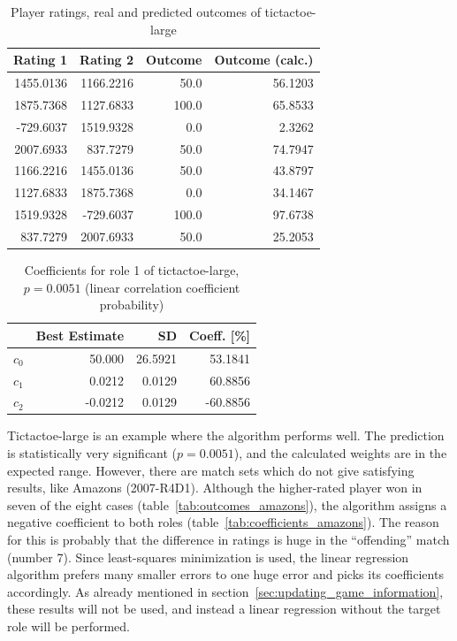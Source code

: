 \documentclass[a4paper,10pt]{article}
\begin{document}
\begin{table}[htp]
	\begin{center}
		\begin{tabular}{rrrr}
			\hline
			\textbf{Rating 1} & \textbf{Rating 2} & \textbf{Outcome} & \textbf{Outcome (calc.)} \\ 
			\hline
			1455.0136    &	1166.2216    &	50.0         &	56.1203 \\
			1875.7368    &	1127.6833    &	100.0        &	65.8533 \\
			-729.6037    &	1519.9328    &	0.0          &	2.3262  \\
			2007.6933    &	837.7279     &	50.0         &	74.7947 \\
			1166.2216    &	1455.0136    &	50.0         &	43.8797 \\
			1127.6833    &	1875.7368    &	0.0          &	34.1467 \\
			1519.9328    &	-729.6037    &	100.0        &	97.6738 \\
			837.7279     &	2007.6933    &	50.0         &	25.2053 \\
			\hline
		\end{tabular}
	\end{center}
	\caption{Player ratings, real and predicted outcomes of tictactoe-large}
	\label{tab:outcomes_tictactoelarge}
\end{table}

\begin{table}[htp]
	\begin{center}
		\begin{tabular}{rrrr}
			\hline
			& \textbf{Best Estimate} & \textbf{SD} & \textbf{Coeff. [\%]} \\ 
			\hline
			$c_0$   &	50.000       &	26.5921      &	53.1841 \\
			$c_1$   &	0.0212       &	0.0129       &	60.8856 \\
			$c_2$   &	-0.0212      &	0.0129       &	-60.8856 \\
			\hline
		\end{tabular}
	\end{center}
	\caption{Coefficients for role 1 of tictactoe-large, $p = 0.0051$ (linear correlation coefficient probability)}
	\label{tab:coefficients_tictactoelarge}
\end{table}

Tictactoe-large is an example where the algorithm performs well. The prediction is statistically very significant ($p = 0.0051$), and the calculated weights are in the expected range. However, there are match sets which do not give satisfying results, like Amazons (2007-R4D1). Although the higher-rated player won in seven of the eight cases (table~\ref{tab:outcomes_amazons}), the algorithm assigns a negative coefficient to both roles (table~\ref{tab:coefficients_amazons}). The reason for this is probably that the difference in ratings is huge in the ``offending'' match (number 7). Since least-squares minimization is used, the linear regression algorithm prefers many smaller errors to one huge error and picks its coefficients accordingly. As already mentioned in section~\ref{sec:updating_game_information}, these results will not be used, and instead a linear regression without the target role will be performed.
\end{document}
